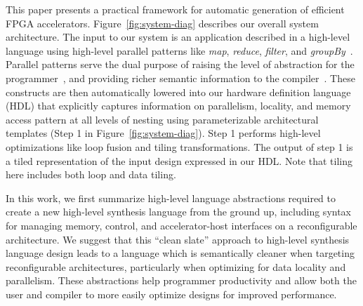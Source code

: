 This paper presents a practical framework for automatic generation of
efficient FPGA accelerators. Figure~\ref{fig:system-diag} describes
our overall system architecture. The input to our system is an
application described in a high-level language using high-level
parallel patterns like \emph{map}, \emph{reduce},
\emph{filter}, and \emph{groupBy}~\cite{optiml}.
Parallel patterns serve the dual purpose of raising the
level of abstraction for the
programmer~\cite{ecoop13sujeeth,pldi13halide}, and providing richer
semantic information to the compiler~\cite{delite-tecs14}. These
constructs are then automatically lowered into our hardware definition
language (HDL) that explicitly captures information on parallelism,
locality, and memory access pattern at all levels of nesting using
parameterizable architectural templates (Step 1 in
Figure~\ref{fig:system-diag}). Step 1 performs high-level
optimizations like loop fusion and tiling transformations. The output
of step 1 is a tiled representation of the input design expressed in
our HDL. Note that tiling here includes both loop and data tiling.

In this work, we first summarize high-level language abstractions required to create a new high-level synthesis language from the ground up, including syntax for managing memory, control, and accelerator-host interfaces on a reconfigurable architecture.
We suggest that this ``clean slate'' approach to high-level synthesis language design leads to a language which is semantically cleaner when targeting reconfigurable architectures, particularly when optimizing for data locality and parallelism. 
These abstractions help programmer productivity and allow both the user and compiler to more easily optimize designs for improved performance. 


